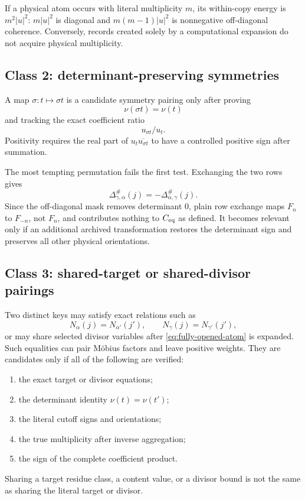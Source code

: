 If a physical atom occurs with literal multiplicity \(m\), its
within-copy energy is \(m^2|u|^2\): \(m|u|^2\) is diagonal and
\(m(m-1)|u|^2\) is nonnegative off-diagonal coherence.  Conversely,
records created solely by a computational expansion do not acquire
physical multiplicity.

\subsection{Class 2: determinant-preserving symmetries}

A map \(\sigma:t\mapsto\sigma t\) is a candidate symmetry pairing
only after proving
\begin{equation}
 \nu(\sigma t)=\nu(t)
\label{eq:symmetry-det-preserve}
\end{equation}
and tracking the exact coefficient ratio
\[
 u_{\sigma t}/u_t.
\]
Positivity requires the real part of
\(u_t\overline{u_{\sigma t}}\) to have a controlled positive sign
after summation.

The most tempting permutation fails the first test.  Exchanging the
two rows gives
\begin{equation}
 \Delta^\#_{\gamma,\alpha}(j)
 =-\Delta^\#_{\alpha,\gamma}(j).
\label{eq:row-swap-sign}
\end{equation}
Since the off-diagonal mask removes determinant \(0\), plain row
exchange maps \(F_n\) to \(F_{-n}\), not \(F_n\), and contributes
nothing to \(C_{\mathrm{eq}}\) as defined.  It becomes relevant only if an
additional archived transformation restores the determinant sign and
preserves all other physical orientations.

\subsection{Class 3: shared-target or shared-divisor pairings}

Two distinct keys may satisfy exact relations such as
\begin{equation}
 N_\alpha(j)=N_{\alpha'}(j'),\qquad
 N_\gamma(j)=N_{\gamma'}(j'),
\label{eq:shared-target}
\end{equation}
or may share selected divisor variables after
\eqref{eq:fully-opened-atom} is expanded.  Such equalities can pair
M\"obius factors and leave positive weights.  They are candidates
only if all of the following are verified:
\begin{enumerate}[leftmargin=2.2em]
 \item the exact target or divisor equations;
 \item the determinant identity \(\nu(t)=\nu(t')\);
 \item the literal cutoff signs and orientations;
 \item the true multiplicity after inverse aggregation;
 \item the sign of the complete coefficient product.
\end{enumerate}
Sharing a target residue class, a content value, or a divisor bound is
not the same as sharing the literal target or divisor.

